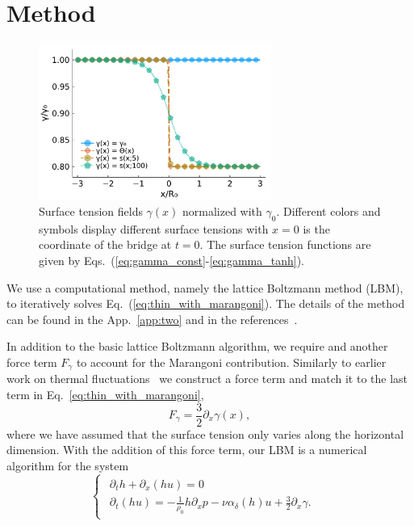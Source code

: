 \section{Method}\label{sec:method_five}
\begin{figure}
    \centering
    \includegraphics[width=0.68\textwidth]{graphics/gammas.pdf}
    \caption{Surface tension fields $\gamma(x)$ normalized with $\gamma_0$.
    Different colors and symbols display different surface tensions with $x=0$ is the coordinate of the bridge at $t=0$.
    The surface tension functions are given by Eqs.~(\ref{eq:gamma_const}-\ref{eq:gamma_tanh}).
    }
    \label{fig:gammas}
\end{figure}
We use a computational method, namely the lattice Boltzmann method (LBM), to iteratively solves Eq.~(\ref{eq:thin_with_marangoni}).
The details of the method can be found in the App.~\ref{app:two} and in the references~\cite{zitzLatticeBoltzmannMethod2019, zitzLatticeBoltzmannSimulations2021}.

In addition to the basic lattice Boltzmann algorithm, we require and another force term $F_{\gamma}$ to account for the Marangoni contribution.
Similarly to earlier work on thermal fluctuations~\cite{zitzLatticeBoltzmannSimulations2021} we construct a force term and match it to the last term in Eq.~\ref{eq:thin_with_marangoni}, 
\begin{equation}\label{eq:force_gamma_grad}
    F_{\gamma} = \frac{3}{2}\partial_x\gamma(x),
\end{equation}
where we have assumed that the surface tension only varies along the horizontal dimension.
With the addition of this force term, our LBM is a numerical algorithm for the system
\begin{equation}\label{eq:lubr2eq1surf}
\begin{cases}
\begin{array}{ll}
\partial_t h + \partial_x (h u)  = 0 & \\ 
\partial_t (h u) = -\frac{1}{\rho_0}h\partial_x p -\nu\alpha_{\delta}(h)u + \frac{3}{2}\partial_x\gamma.
\end{array}
\end{cases}
\end{equation}

